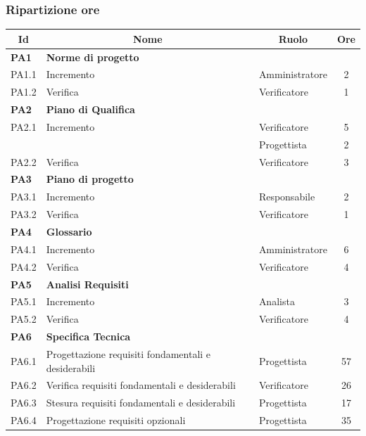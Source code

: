 \subsubsection{Ripartizione ore}
\begin{table}[H]
	\centering
	\begin{tabular*}{1\textwidth}{ @{\extracolsep{\fill} } l l l c  }
	\hline
	\multicolumn{1}{c}{\textbf{Id}} & 
	\multicolumn{1}{c}{\textbf{Nome}} & 
	\multicolumn{1}{c}{\textbf{Ruolo}}& 
	\multicolumn{1}{c}{\textbf{Ore}} \\
	\hline
	
	\textbf{PA1} & \textbf{Norme di progetto} \\
	\cline{3-4}
	PA1.1 & Incremento & Amministratore & 2\\ 
        \cline{3-4}
	PA1.2 & Verifica & Verificatore & 1\\
	
	\hline
	\textbf{PA2} & \textbf{Piano di Qualifica} \\
	\cline{3-4}
	PA2.1 & Incremento & Verificatore & 5\\ 
        & & Progettista & 2 \\
        \cline{3-4}
	PA2.2 & Verifica & Verificatore &  3\\
	
	\hline
	\textbf{PA3} & \textbf{Piano di progetto} \\
	\cline{3-4}
	PA3.1 & Incremento & Responsabile & 2\\ 
        \cline{3-4}
	PA3.2 & Verifica & Verificatore & 1\\

	\hline
	\textbf{PA4} & \textbf{Glossario} \\
	\cline{3-4}
	PA4.1 & Incremento & Amministratore & 6\\ 
        \cline{3-4}
	PA4.2 & Verifica & Verificatore & 4\\

        \hline
        \textbf{PA5} & \textbf{Analisi Requisiti}\\
        \cline{3-4}
        PA5.1 & Incremento & Analista & 3\\
        \cline{3-4}
        PA5.2 & Verifica & Verificatore & 4\\

        \hline
        \textbf{PA6} & \textbf{Specifica Tecnica} \\
	\cline{3-4}
	PA6.1 & Progettazione requisiti fondamentali e desiderabili & Progettista & 57\\ 
        \cline{3-4}
	PA6.2 & Verifica requisiti fondamentali e desiderabili & Verificatore & 26\\
        \cline{3-4}
	PA6.3 & Stesura requisiti fondamentali e desiderabili & Progettista & 17\\
        \cline{3-4}
	PA6.4 & Progettazione requisiti opzionali & Progettista & 35\\


\end{tabular*}
\end{table}
